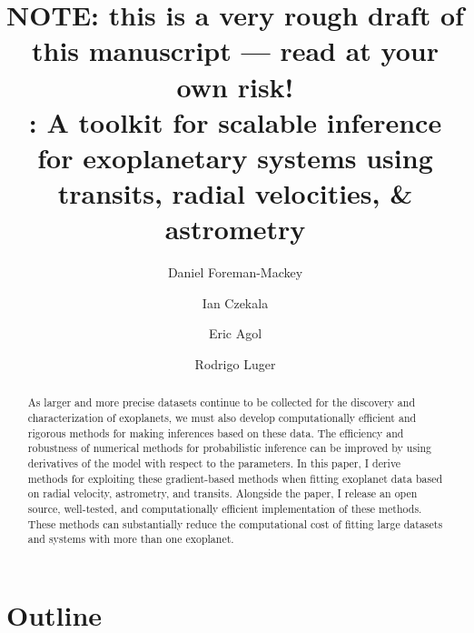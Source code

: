 \documentclass[modern]{aastex62}
\begin{document}
\raggedbottom\sloppy\sloppypar\frenchspacing

\title{%
{\bf NOTE: this is a very rough draft of this manuscript --- read at your own risk!}
\\
:
A toolkit for scalable inference for exoplanetary systems using transits,
radial velocities, \& astrometry
}

\author[0000-0002-9328-5652]{Daniel Foreman-Mackey}

\author[0000-0002-1483-8811]{Ian Czekala}

\author[0000-0002-0802-9145]{Eric Agol}

\author[0000-0002-0296-3826]{Rodrigo Luger}

\begin{abstract}

As larger and more precise datasets continue to be collected for the discovery and characterization of exoplanets, we must also develop computationally efficient and rigorous methods for making inferences based on these data.
The efficiency and robustness of numerical methods for probabilistic inference
can be improved by using derivatives of the model with respect to the
parameters.
In this paper, I derive methods for exploiting these gradient-based methods
when fitting exoplanet data based on radial velocity, astrometry, and
transits.
Alongside the paper, I release an open source, well-tested, and
computationally efficient implementation of these methods.
These methods can substantially reduce the computational cost of fitting large
datasets and systems with more than one exoplanet.

\end{abstract}


\section{Outline}
\end{document}
